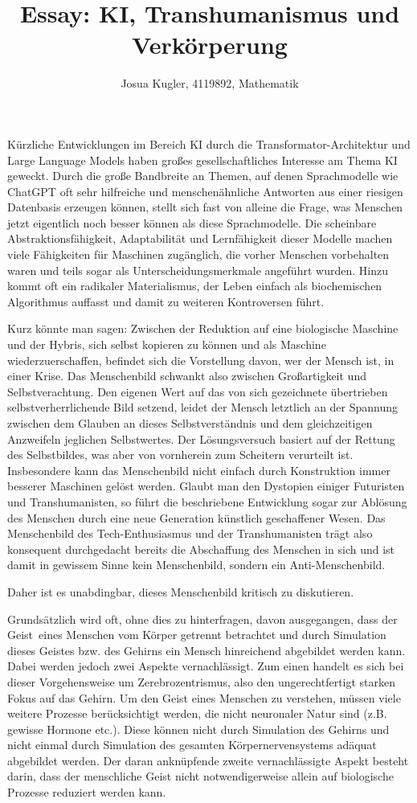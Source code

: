 \documentclass[12pt]{article}
\title{Essay: KI, Transhumanismus und Verkörperung}
\author{Josua Kugler, 4119892, Mathematik}
\begin{document}
\maketitle
\noindent Kürzliche Entwicklungen im Bereich KI durch die \glqq Transformator\grqq-Architektur und Large Language Models haben großes gesellschaftliches Interesse
am Thema KI geweckt. Durch die große Bandbreite an Themen, auf denen Sprachmodelle wie ChatGPT oft sehr hilfreiche und menschenähnliche Antworten aus einer
riesigen Datenbasis erzeugen können, stellt sich fast von alleine die Frage, was Menschen jetzt eigentlich noch besser können als diese Sprachmodelle.
Die scheinbare Abstraktionsfähigkeit, Adaptabilität und Lernfähigkeit dieser Modelle machen viele Fähigkeiten für Maschinen zugänglich,
die vorher Menschen vorbehalten waren und teils sogar als Unterscheidungsmerkmale angeführt wurden. 
Hinzu kommt oft ein radikaler Materialismus, der Leben einfach als biochemischen Algorithmus auffasst und damit zu weiteren Kontroversen führt.

Kurz könnte man sagen: Zwischen der Reduktion auf eine biologische Maschine und der Hybris, sich selbst kopieren zu können und als Maschine wiederzuerschaffen,
befindet sich die Vorstellung davon, wer der Mensch ist, in einer Krise.
Das Menschenbild schwankt also zwischen Großartigkeit und Selbstverachtung.
Den eigenen Wert auf das von sich gezeichnete übertrieben selbstverherrlichende Bild setzend, 
leidet der Mensch letztlich an der Spannung zwischen dem Glauben an dieses Selbstverständnis und dem gleichzeitigen Anzweifeln jeglichen Selbstwertes.
Der Lösungsversuch basiert auf der Rettung des Selbstbildes, was aber von vornherein zum Scheitern verurteilt ist.
Insbesondere kann das Menschenbild nicht einfach durch Konstruktion immer besserer Maschinen gelöst werden.
Glaubt man den Dystopien einiger Futuristen und Transhumanisten, so führt die beschriebene Entwicklung sogar zur Ablösung des
Menschen durch eine neue Generation künstlich geschaffener Wesen.
Das Menschenbild des Tech-Enthusiasmus und der Transhumanisten trägt also konsequent durchgedacht bereits die Abschaffung des Menschen in sich
und ist damit in gewissem Sinne kein Menschenbild, sondern ein Anti-Menschenbild.

Daher ist es unabdingbar, dieses Menschenbild kritisch zu diskutieren.

Grundsätzlich wird oft, ohne dies zu hinterfragen, davon ausgegangen, dass der \glqq Geist\grqq\ eines Menschen vom Körper getrennt betrachtet
und durch Simulation dieses Geistes bzw. des Gehirns ein Mensch hinreichend abgebildet werden kann. Dabei werden jedoch zwei Aspekte vernachlässigt.
Zum einen handelt es sich bei dieser Vorgehensweise um Zerebrozentrismus, also den ungerechtfertigt starken Fokus auf das Gehirn.
Um den Geist eines Menschen zu verstehen, müssen viele weitere Prozesse berücksichtigt werden, die nicht neuronaler Natur sind (z.B. gewisse Hormone etc.).
Diese können nicht durch Simulation des Gehirns und nicht einmal durch Simulation des gesamten Körpernervensystems adäquat abgebildet werden.
Der daran anknüpfende zweite vernachlässigte Aspekt besteht darin, dass der menschliche Geist nicht notwendigerweise allein auf biologische Prozesse reduziert werden kann.
\end{document}
